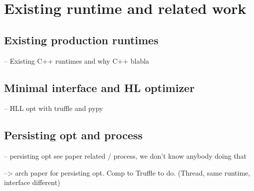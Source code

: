 \documentclass[a4paper,12pt,twoside]{../includes/ThesisStyle}
\begin{document}
\fi

\chapter{Existing runtime and related work}
\label{chap:comparison}
\minitoc

\section{Existing production runtimes}
-- Existing C++ runtimes and why C++ blabla

\section{Minimal interface and HL optimizer}
-- HLL opt with truffle and pypy

\section{Persisting opt and process}
-- persisting opt see paper related / process, we don't know anybody doing that

--> arch paper for persisting opt. Comp to Truffle to do. (Thread, same runtime, interface different)


\ifx\wholebook\relax\else
    
\end{document}
